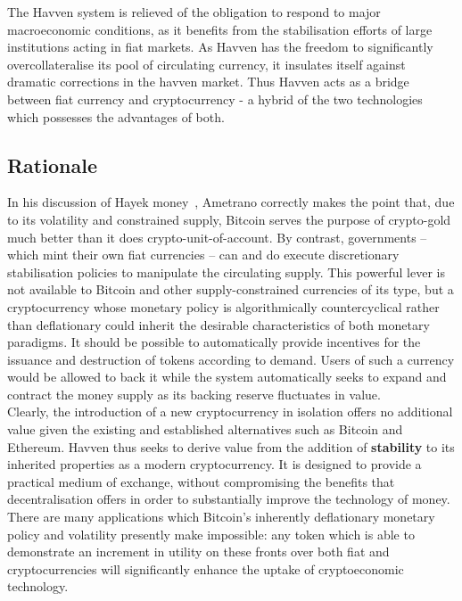 \noindent The Havven system is relieved of the obligation to respond to major macroeconomic conditions, 
as it benefits from the stabilisation efforts of large institutions acting in fiat markets.
As Havven has the freedom to significantly overcollateralise its pool of circulating currency, it
insulates itself against dramatic corrections in the havven market.
Thus Havven acts as a bridge between fiat currency and cryptocurrency - a hybrid of the two technologies which possesses
the advantages of both. \\

\subsection{Rationale}

\noindent  In his discussion of Hayek money~\cite{ametrano2016hayek}, Ametrano correctly makes the point that,
due to its volatility and constrained supply, Bitcoin serves the purpose of crypto-gold much better than it
does crypto-unit-of-account. By contrast, governments -- which mint their own fiat currencies -- can and do execute
discretionary stabilisation policies to manipulate the circulating supply. This powerful lever is not
available to Bitcoin and other supply-constrained currencies of its type, but a cryptocurrency whose monetary
policy is algorithmically countercyclical rather than deflationary could inherit the desirable characteristics
of both monetary paradigms. It should be possible to automatically provide incentives for the issuance and
destruction of tokens according to demand. Users of such a currency would be allowed to back it while
the system automatically seeks to expand and contract the money supply as its backing
reserve fluctuates in value. \\

\noindent Clearly, the introduction of a new cryptocurrency in isolation offers no additional value given
the existing and established alternatives such as Bitcoin and Ethereum. Havven thus seeks to derive value
from the addition of \textbf{stability} to its inherited properties as a modern cryptocurrency.
It is designed to provide a practical medium of exchange, without compromising the benefits that
decentralisation offers in order to substantially improve the technology of money.
There are many applications which Bitcoin's inherently deflationary monetary policy and
volatility presently make impossible: any token which is able to demonstrate an increment
in utility on these fronts over both fiat and cryptocurrencies will significantly
enhance the uptake of cryptoeconomic technology.

\pagebreak
